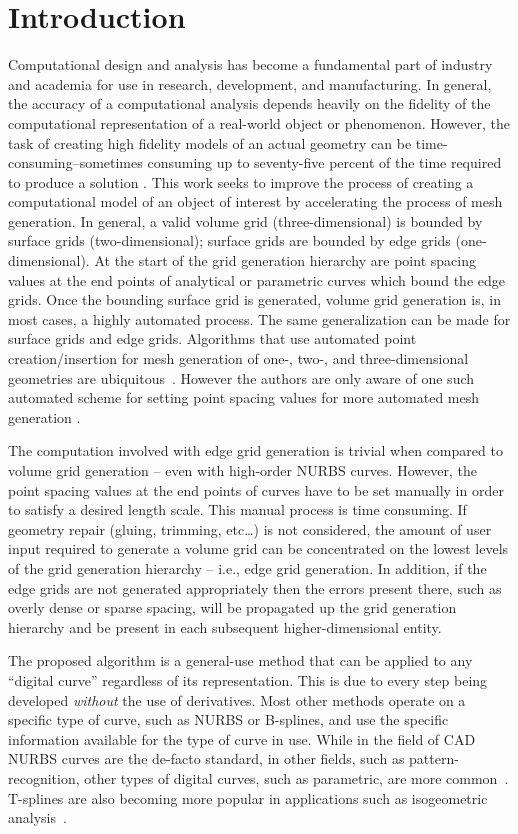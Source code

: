 \section{Introduction}
Computational design and analysis has become a fundamental part of 
industry and academia for use in research, development, and manufacturing. 
In general, the accuracy of a computational analysis depends heavily on 
the fidelity of the computational representation of a real-world object or 
phenomenon.  However, the task of creating high fidelity models of an 
actual geometry can be time-consuming--sometimes consuming up to 
seventy-five percent of the time required to produce a solution 
\cite{bischoff05}. This work seeks to improve the process of creating a 
computational model of an object of interest by accelerating the process 
of mesh generation. In general, a valid volume grid (three-dimensional) is 
bounded by surface grids (two-dimensional); surface grids are bounded by edge grids (one-dimensional). At the start of the grid generation hierarchy are point spacing values at the end points of analytical or parametric curves which bound the edge grids. Once the bounding surface grid is generated, volume grid generation is, in most cases, a highly automated process. The same generalization can be made for surface grids and edge grids. 
Algorithms that use automated point creation/insertion for mesh generation of one-, two-, and three-dimensional geometries are ubiquitous~\cite{cubit,delaunay,aflr}. However the authors are only aware of one such automated scheme for setting point spacing values for more automated mesh generation \cite{mclaurin12}.

The computation involved with edge grid generation is trivial when 
compared to volume grid generation -- even with high-order NURBS curves.  
However, the point spacing values at the end points of curves have to be 
set manually in order to satisfy a desired length scale. This manual 
process is time consuming. If geometry repair (gluing, trimming, etc…) is 
not considered, the amount of user input required to generate a volume 
grid can be concentrated on the lowest levels of the grid generation 
hierarchy -- i.e., edge grid generation.  In addition, if the edge grids 
are not generated appropriately then the errors present there, such as 
overly dense or sparse spacing, will be propagated up the grid generation hierarchy and be present in each subsequent higher-dimensional entity.

The proposed algorithm is a general-use method that can be applied to any ``digital curve'' regardless of its representation. This is due to every step being developed {\it without} the use of derivatives. Most other methods operate on a specific type of curve, such as NURBS or B-splines, and use the specific information available for the type of curve in use. While in the field of CAD NURBS curves are the de-facto standard, in other fields, such as pattern-recognition, other types of digital curves, such as parametric, are more common~\cite{interactive_curve_modeling}.  T-splines are also becoming more popular in applications such as isogeometric analysis~\cite{iga}. 

